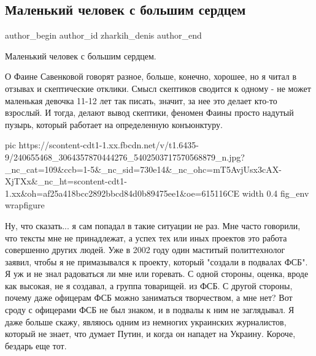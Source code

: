  
 
 
 
 
 
\subsection{Маленький человек с большим сердцем}
\label{sec:27_08_2021.fb.zharkih_denis.1.savenkova}
 
\ifcmt
 author_begin
   author_id zharkih_denis
 author_end
\fi

Маленький человек с большим сердцем. 

О Фаине Савенковой говорят разное, больше, конечно, хорошее, но я читал в
отзывах и скептические отклики. Смысл скептиков сводится к одному - не может
маленькая девочка 11-12 лет так писать, значит, за нее это делает кто-то
взрослый. И тогда, делают вывод скептики, феномен Фаины просто надутый пузырь,
который работает на определенную конъюнктуру. 

\ifcmt
  pic https://scontent-cdt1-1.xx.fbcdn.net/v/t1.6435-9/240655468_3064357870444276_5402503717570568879_n.jpg?_nc_cat=109&ccb=1-5&_nc_sid=730e14&_nc_ohc=mT5AvjUsx3cAX-XjTXx&_nc_ht=scontent-cdt1-1.xx&oh=af25a418bcc2892bbcd84d0b89475ee1&oe=615116CE
  width 0.4
	fig_env wrapfigure
\fi

Ну, что сказать... я сам попадал в такие ситуации не раз. Мне часто говорили,
что тексты мне не принадлежат, а успех тех или иных проектов это работа
совершенно других людей. Уже в 2002 году один маститый политтехнолог заявил,
чтобы я не примазывался к проекту, который "создали в подвалах ФСБ". Я уж и не
знал радоваться ли мне или горевать. С одной стороны, оценка, вроде как
высокая, не я создавал, а группа товарищей.  из ФСБ. С другой стороны, почему
даже офицерам ФСБ можно заниматься творчеством, а мне нет? Вот сроду с
офицерами ФСБ не был знаком, и в подвалы к ним не заглядывал. Я даже больше
скажу, являюсь одним из немногих украинских журналистов, который не знает, что
думает Путин, и когда он нападет на Украину. Короче, бездарь еще тот. 

